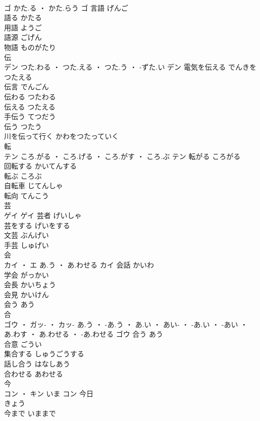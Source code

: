 \documentclass[8pt]{extreport}
\begin{document}
\begin{CJK}{UTF8}{min}
\\	ゴ	かた.る ・ かた.らう	ゴ	言語	げんご	
\\	語る	かたる	
\\	用語	ようご	
\\	語源	ごげん	
\\	物語	ものがたり	
\\	伝	
\\	デン	つた.わる ・ つた.える ・ つた.う ・ -ずた.い	デン	電気を伝える	でんきをつたえる	
\\	伝言	でんごん	
\\	伝わる	つたわる	
\\	伝える	つたえる	
\\	手伝う	てつだう	
\\	伝う	つたう	
\\	川を伝って行く	かわをつたっていく	
\\	転	
\\	テン	ころ.がる ・ ころ.げる ・ ころ.がす ・ ころ.ぶ	テン	転がる	ころがる	
\\	回転する	かいてんする	
\\	転ぶ	ころぶ	
\\	自転車	じてんしゃ	
\\	転向	てんこう	
\\	芸	
\\	ゲイ		ゲイ	芸者	げいしゃ	
\\	芸をする	げいをする	
\\	文芸	ぶんげい	
\\	手芸	しゅげい	
\\	会	
\\	カイ ・ エ	あ.う ・ あ.わせる	カイ	会話	かいわ	
\\	学会	がっかい	
\\	会長	かいちょう	
\\	会見	かいけん	
\\	会う	あう	
\\	合	
\\	ゴウ ・ ガッ- ・ カッ-	あ.う ・ -あ.う ・ あ.い ・ あい- ・ -あ.い ・ -あい ・ あ.わす ・ あ.わせる ・ -あ.わせる	ゴウ	合う	あう	
\\	合意	ごうい	
\\	集合する	しゅうごうする	
\\	話し合う	はなしあう	
\\	合わせる	あわせる	
\\	今	
\\	コン ・ キン	いま	コン	今日 
\\	きょう	
\\	今まで	いままで	

\end{CJK}
\end{document}
